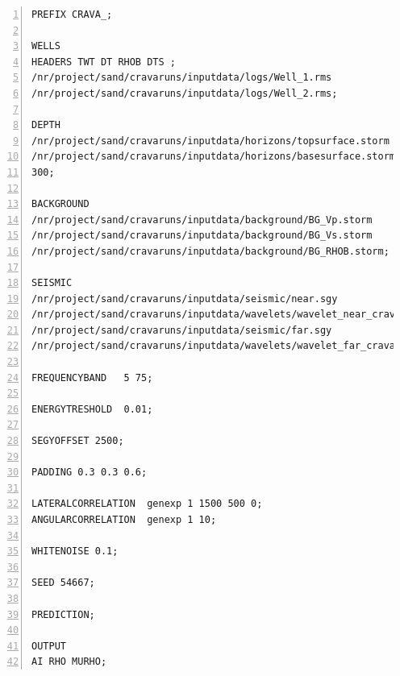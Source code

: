 \documentclass[screen,citenumeric,long,10pt]{nrdoc_060418}
\begin{document}
\begin{small}
\begin{Verbatim}[numbers=left]
PREFIX CRAVA_;

WELLS
HEADERS TWT DT RHOB DTS ;
/nr/project/sand/cravaruns/inputdata/logs/Well_1.rms
/nr/project/sand/cravaruns/inputdata/logs/Well_2.rms;

DEPTH
/nr/project/sand/cravaruns/inputdata/horizons/topsurface.storm
/nr/project/sand/cravaruns/inputdata/horizons/basesurface.storm
300;

BACKGROUND
/nr/project/sand/cravaruns/inputdata/background/BG_Vp.storm
/nr/project/sand/cravaruns/inputdata/background/BG_Vs.storm
/nr/project/sand/cravaruns/inputdata/background/BG_RHOB.storm;

SEISMIC
/nr/project/sand/cravaruns/inputdata/seismic/near.sgy                  15 .35
/nr/project/sand/cravaruns/inputdata/wavelets/wavelet_near_crava.txt             -0.80
/nr/project/sand/cravaruns/inputdata/seismic/far.sgy                   40 .39
/nr/project/sand/cravaruns/inputdata/wavelets/wavelet_far_crava.txt              -0.90;

FREQUENCYBAND   5 75;

ENERGYTRESHOLD  0.01;

SEGYOFFSET 2500;

PADDING 0.3 0.3 0.6;

LATERALCORRELATION  genexp 1 1500 500 0;
ANGULARCORRELATION  genexp 1 10;

WHITENOISE 0.1;

SEED 54667;

PREDICTION;

OUTPUT 
AI RHO MURHO;
\end{Verbatim}
\end{small}



\end{document}
